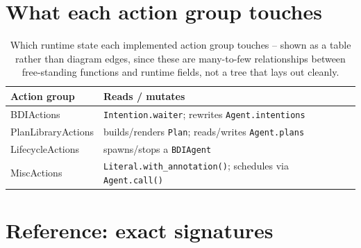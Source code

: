 \documentclass[11pt,a4paper]{article}
\begin{document}
\section*{What each action group touches}

\begin{table}[h]
\centering
\begin{tabular}{|l|l|}
\hline
\textbf{Action group} & \textbf{Reads / mutates} \\ \hline
BDIActions & \texttt{Intention.waiter}; rewrites \texttt{Agent.intentions} \\ \hline
PlanLibraryActions & builds/renders \texttt{Plan}; reads/writes \texttt{Agent.plans} \\ \hline
LifecycleActions & spawns/stops a \texttt{BDIAgent} \\ \hline
MiscActions & \texttt{Literal.with\_annotation()}; schedules via \texttt{Agent.call()} \\ \hline
\end{tabular}
\caption{Which runtime state each implemented action group touches --
shown as a table rather than diagram edges, since these are many-to-few
relationships between free-standing functions and runtime fields, not a
tree that lays out cleanly.}
\label{tab:touches}
\end{table}

\section*{Reference: exact signatures}
\end{document}
